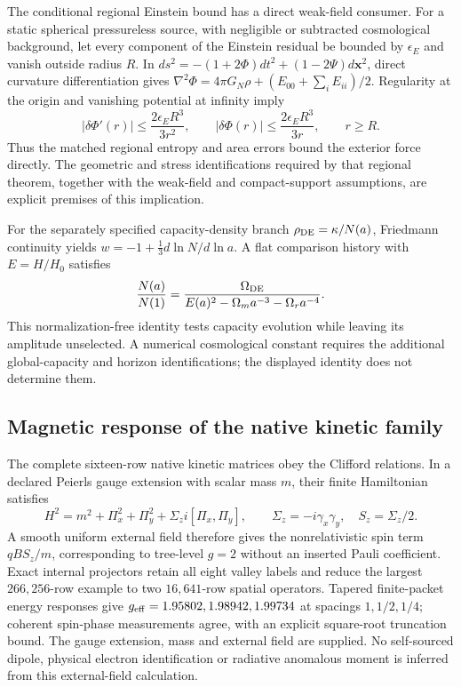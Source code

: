 The conditional regional Einstein bound has a direct weak-field consumer.
For a static spherical pressureless source, with negligible or subtracted
cosmological background, let every component of the Einstein residual be
bounded by $\epsilon_E$ and vanish outside radius $R$.  In
$ds^2=-(1+2\Phi)dt^2+(1-2\Psi)d\mathbf x^2$, direct curvature
differentiation gives
$\nabla^2\Phi=4\pi G_N\rho+(E_{00}+\sum_iE_{ii})/2$.
Regularity at the origin and vanishing potential at infinity imply
\[
 |\delta\Phi'(r)|\le\frac{2\epsilon_E R^3}{3r^2},
 \qquad |\delta\Phi(r)|\le\frac{2\epsilon_E R^3}{3r},\qquad r\ge R.
\]
Thus the matched regional entropy and area errors bound the exterior
force directly.  The geometric and stress identifications required by
that regional theorem, together with the weak-field and compact-support
assumptions, are explicit premises of this implication.

For the separately specified capacity-density branch
$\rho_{\rm DE}=\kappa/N(a)$, Friedmann continuity yields
$w=-1+\tfrac13d\ln N/d\ln a$.  A flat comparison history with
$E=H/H_0$ satisfies
\[
 \frac{N(a)}{N(1)}=
 \frac{\Omega_{\rm DE}}
 {E(a)^2-\Omega_m a^{-3}-\Omega_r a^{-4}}.
\]
This normalization-free identity tests capacity evolution while leaving
its amplitude unselected.  A numerical cosmological constant requires
the additional global-capacity and horizon identifications; the displayed
identity does not determine them.

\subsection{Magnetic response of the native kinetic family}

The complete sixteen-row native kinetic matrices obey the Clifford relations. In a declared Peierls gauge extension with scalar mass $m$, their finite Hamiltonian satisfies
\[
 H^2=m^2+\Pi_x^2+\Pi_y^2+\Sigma_z i[\Pi_x,\Pi_y],\qquad
 \Sigma_z=-i\gamma_x\gamma_y,\quad S_z=\Sigma_z/2.
\]
A smooth uniform external field therefore gives the nonrelativistic spin term $qBS_z/m$, corresponding to tree-level $g=2$ without an inserted Pauli coefficient. Exact internal projectors retain all eight valley labels and reduce the largest $266{,}256$-row example to two $16{,}641$-row spatial operators. Tapered finite-packet energy responses give $g_{\rm eff}=1.95802,1.98942,1.99734$ at spacings $1,1/2,1/4$; coherent spin-phase measurements agree, with an explicit square-root truncation bound. The gauge extension, mass and external field are supplied. No self-sourced dipole, physical electron identification or radiative anomalous moment is inferred from this external-field calculation.

